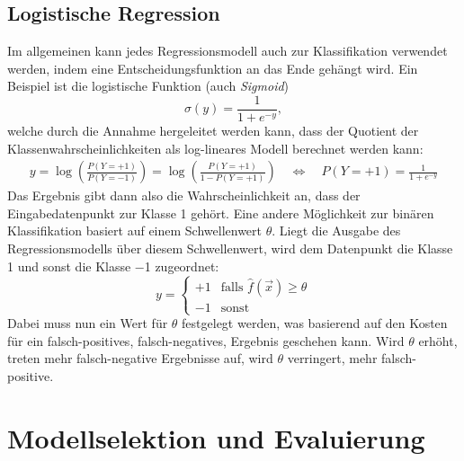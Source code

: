 	\section{Logistische Regression}
		Im allgemeinen kann jedes Regressionsmodell auch zur Klassifikation verwendet werden, indem eine Entscheidungsfunktion an das Ende gehängt wird. Ein Beispiel ist die logistische Funktion (auch \emph{Sigmoid})
		\begin{equation}
			\sigma(y) = \frac{1}{1 + e^{-y}},
		\end{equation}
		welche durch die Annahme hergeleitet werden kann, dass der Quotient der Klassenwahrscheinlichkeiten als log-lineares Modell berechnet werden kann:
		\begin{gather}
			y = \log( \frac{P(Y = +1)}{P(Y = -1)} ) = \log( \frac{P(Y = +1)}{1 - P(Y = +1)} )
			\quad\iff\quad  P(Y = +1) = \frac{1}{1 + e^{-y}}
		\end{gather}
		Das Ergebnis gibt dann also die Wahrscheinlichkeit an, dass der Eingabedatenpunkt zur Klasse \num{1} gehört. Eine andere Möglichkeit zur binären Klassifikation basiert auf einem Schwellenwert \(\theta\). Liegt die Ausgabe des Regressionsmodells über diesem Schwellenwert, wird dem Datenpunkt die Klasse \num{+1} und sonst die Klasse \num{-1} zugeordnet:
		\begin{equation}
			y =
				\begin{cases}
					+1 & \text{falls } \hat{f}(\vec{x}) \geq \theta \\
					-1 & \text{sonst}
				\end{cases}
		\end{equation}
		Dabei muss nun ein Wert für \(\theta\) festgelegt werden, was \zB basierend auf den Kosten für ein falsch-positives, \bzw falsch-negatives, Ergebnis geschehen kann. Wird \(\theta\) erhöht, treten mehr falsch-negative Ergebnisse auf, wird \(\theta\) verringert, mehr falsch-positive.

\chapter{Modellselektion und Evaluierung} %
	\label{c:evaluation}

